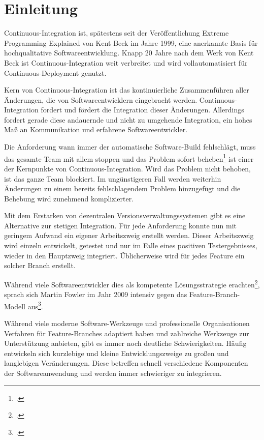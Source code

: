\chapter{Einleitung}

Continuous-Integration ist, spätestens seit der Veröffentlichung \glqq Extreme Programming Explained\grqq{}  von Kent Beck im Jahre 1999,
eine anerkannte Basis für hochqualitative Softwareentwicklung. Knapp 20 Jahre nach dem Werk von Kent Beck ist Continuous-Integration weit
verbreitet und wird vollautomatisiert für Continuous-Deployment genutzt.

Kern von Continuous-Integration ist das kontinuierliche Zusammenführen aller Änderungen, die von Softwareentwicklern eingebracht werden. Continuous-Integration fordert und fördert die Integration dieser Änderungen.
Allerdings fordert gerade diese andauernde und nicht zu umgehende Integration, ein hohes Maß an Kommunikation und erfahrene Softwareentwickler.

Die Anforderung \glqq wann immer der automatische Software-Build fehlschlägt, muss das gesamte Team mit allem stoppen und das Problem sofort beheben\grqq{}\footcite[vgl.][]{humble2010} ist einer der Kernpunkte von Continuous-Integration. Wird das Problem nicht behoben, ist das ganze Team blockiert. Im ungünstigeren Fall werden weiterhin Änderungen zu einem bereits fehlschlagendem Problem hinzugefügt und die Behebung wird zunehmend komplizierter.

Mit dem Erstarken von dezentralen Versionsverwaltungssystemen gibt es eine Alternative zur stetigen Integration. Für jede Anforderung konnte nun mit geringem Aufwand ein eigener Arbeitszweig erstellt werden. Dieser Arbeitszweig wird einzeln entwickelt, getestet und nur im Falle eines positiven Testergebnisses, wieder in den Hauptzweig integriert. Üblicherweise wird für jedes Feature ein solcher Branch erstellt.

Während viele Softwareentwickler dies als kompetente Lösungsstrategie erachten\footcite{ci-is-dead}, sprach sich Martin Fowler im Jahr 2009 intensiv gegen das Feature-Branch-Modell aus\footcite{fowler-feature-branch}.

Während viele moderne Software-Werkzeuge und professionelle Organisationen Verfahren für Feature-Branches adaptiert haben und zahlreiche Werkzeuge zur Unterstützung anbieten, gibt es immer noch deutliche Schwierigkeiten. Häufig entwickeln sich \glqq kurzlebige und kleine\grqq{}
Entwicklungszweige zu \glqq großen und langlebigen\grqq{} Veränderungen. Diese betreffen schnell verschiedene Komponenten der Softwareanwendung und werden immer schwieriger zu integrieren.

